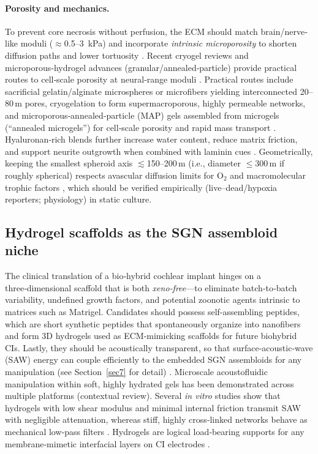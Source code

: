 \documentclass[referee,pdflatex, sn-vancouver-num]{sn-jnl}%
\theoremstyle{thmstyleone}%
\theoremstyle{thmstyletwo}%
\theoremstyle{thmstylethree}%
\begin{document}
\paragraph{Porosity and mechanics.}
To prevent core necrosis without perfusion, the ECM should match brain/nerve‐like moduli ($\approx$0.5–3~kPa) and incorporate \emph{intrinsic microporosity} to shorten diffusion paths and lower tortuosity \citep{Discher2005Stiffness,Budday2015BrainMech,Seidlits2010HALaminin}. 
Recent cryogel reviews and microporous‑hydrogel advances (granular/annealed‑particle) provide practical routes to cell‑scale porosity at neural‑range moduli \cite{Omidian2023_FrontBioengBiotech, Yang2023_SciAdv, Wang2025_FunctBiomat_MAP}. Practical routes include sacrificial gelatin/alginate microspheres or microfibers yielding interconnected 20–80\,\textmu m pores, cryogelation to form supermacroporous, highly permeable networks, and microporous‐annealed‐particle (MAP) gels assembled from microgels (“annealed microgels”) for cell‐scale porosity and rapid mass transport \citep{Bencherif2012Cryogels,Lozinsky2018CryogelsReview,Griffin2015MAP,Highley2016HAReview}. Hyaluronan‐rich blends further increase water content, reduce matrix friction, and support neurite outgrowth when combined with laminin cues \citep{Seidlits2010HALaminin,Highley2016HAReview}. Geometrically, keeping the smallest spheroid axis $\lesssim$150–200\,\textmu m (i.e., diameter $\leq$300\,\textmu m if roughly spherical) respects avascular diffusion limits for O$_2$ and macromolecular trophic factors \citep{Sykova2008Diffusion,Grimes2014SpheroidOxygen}, which should be verified empirically (live–dead/hypoxia reporters; physiology) in static culture.

\subsection{Hydrogel scaffolds as the SGN assembloid niche}
The clinical translation of a bio‑hybrid cochlear implant hinges on a three‑dimensional scaffold that is both \emph{xeno‑free}—to eliminate batch‑to‑batch variability, undefined growth factors, and potential zoonotic agents intrinsic to matrices such as Matrigel. Candidates should possess self-assembling peptides, which are short synthetic peptides that spontaneously organize into nanofibers and form 3D hydrogels used as ECM-mimicking scaffolds for future biohybrid CIs. Lastly, they should be acoustically transparent, so that surface‑acoustic‑wave (SAW) energy can couple efficiently to the embedded SGN assembloids for any manipulation (see Section~\ref{sec7} for detail) \cite{Aisenbrey2020,Kozlowski2021,Sebastian2023}. Microscale acoustofluidic manipulation within soft, highly hydrated gels has been demonstrated across multiple platforms \cite{Zhang2020_AcousticMicrofluidics} (contextual review). Several \textit{in vitro} studies show that hydrogels with low shear modulus and minimal internal friction transmit SAW with negligible attenuation, whereas stiff, highly cross‑linked networks behave as mechanical low‑pass filters \cite{Sebastian2023,Liao2008,Haruna2020}. Hydrogels are logical load‑bearing supports for any membrane‑mimetic interfacial layers on CI electrodes \cite{Carnicer-Lombarte:2025aa}.
\end{document}
